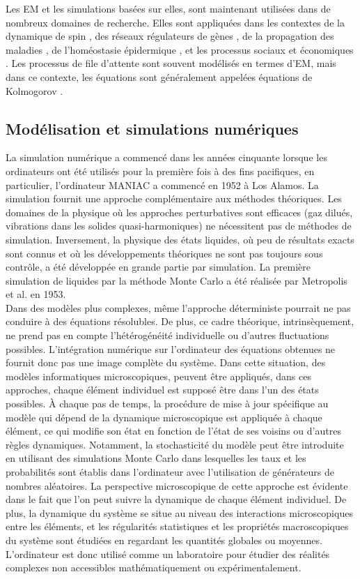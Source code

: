 Les EM et les simulations basées sur elles, sont maintenant utilisées dans de nombreux domaines de recherche. Elles sont appliquées dans les contextes de la dynamique de spin \cite{Glauber1963,Kawasaki1966-1,Kawasaki1966-2,Kawasaki1966-3}, des réseaux régulateurs de gènes \cite{Walczak-al2009,Rao-al2002,Tsimring2014}, de la propagation des maladies \cite{Bailey1950,Rock2014}, de l'homéostasie épidermique \cite{Clayton-al2007}, et les processus sociaux et économiques \cite{Weidlich-Braun1992}. Les processus de file d'attente sont souvent modélisés en termes d'EM, mais dans ce contexte, les équations sont généralement appelées équations de Kolmogorov \cite{Gross-al2008}.\\ 
\subsection{Modélisation et simulations numériques}
La simulation numérique a commencé dans les années cinquante lorsque les ordinateurs ont été utilisés pour la première fois à des fins pacifiques, en particulier, l'ordinateur MANIAC a commencé en 1952 à Los Alamos. La simulation fournit une approche complémentaire aux méthodes théoriques. Les domaines de la physique où les approches perturbatives sont efficaces (gaz dilués, vibrations dans les solides quasi-harmoniques) ne nécessitent pas de méthodes de simulation. Inversement, la physique des états liquides, où peu de résultats exacts sont connus et où les développements théoriques ne sont pas toujours sous contrôle, a été développée en grande partie par simulation. La première simulation de liquides par la méthode Monte Carlo a été réalisée par Metropolis et al. en 1953.\\
Dans des modèles plus complexes, même l'approche déterministe pourrait ne pas conduire à des équations résolubles. De plus, ce cadre théorique, intrinsèquement, ne prend pas en compte l'hétérogénéité individuelle ou d'autres fluctuations possibles. L'intégration numérique sur l'ordinateur des équations obtenues ne fournit donc pas une image complète du système. Dans cette situation, des modèles informatiques microscopiques, peuvent être appliqués, dans ces approches, chaque élément individuel est supposé être dans l'un des états possibles. \`{A} chaque pas de temps, la procédure de mise à jour spécifique au modèle qui dépend de la dynamique microscopique est appliquée à chaque élément, ce qui modifie son état en fonction de l'état de ses voisins ou d'autres règles dynamiques. Notamment, la stochasticité du modèle peut être introduite en utilisant des simulations Monte Carlo dans lesquelles les taux et les probabilités sont établis dans l'ordinateur avec l'utilisation de générateurs de nombres aléatoires. La perspective microscopique de cette approche est évidente dans le fait que l'on peut suivre la dynamique de chaque élément individuel. De plus, la dynamique du système se situe au niveau des interactions microscopiques entre les éléments, et les régularités statistiques et les propriétés macroscopiques du système sont étudiées en regardant les quantités globales ou moyennes. L'ordinateur est donc utilisé comme un laboratoire pour étudier des réalités complexes non accessibles mathématiquement ou expérimentalement.
